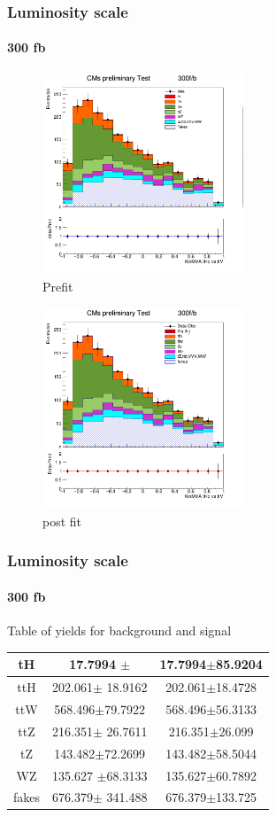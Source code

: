 \documentclass[11pt]{beamer}
\begin{document}
\begin{frame}
\frametitle{Luminosity scale}
\framesubtitle{300 fb}
\begin{multicols}{2}
	\begin{center}
		\begin{figure}
			\includegraphics[width=6cm,height=6cm]{figures/300fb/kin-300.png}
				\caption*{Prefit }
		\end{figure}
	\end{center}
	\columnbreak
	\begin{center}
		\begin{figure}
			\includegraphics[width=6cm,height=6cm]{figures/300fb/simple.png}
				\caption*{post fit }
		\end{figure}
	\end{center}
\end{multicols}
\end{frame}

\begin{frame}
\frametitle{Luminosity scale}
\framesubtitle{300 fb}
Table of yields for background and signal
\begin{table}
	\begin{tabular}{|c|c|c|}
			\hline
tH & 17.7994 $\pm$ & 17.7994$\pm$85.9204\\
\hline
ttH  & 202.061$\pm$ 18.9162 & 202.061$\pm$18.4728\\
\hline
ttW  & 568.496$\pm$79.7922 & 568.496$\pm$56.3133\\
\hline
ttZ  & 216.351$\pm$ 26.7611 & 216.351$\pm$26.099\\
\hline
tZ & 143.482$\pm$72.2699 & 143.482$\pm$58.5044\\
\hline
WZ & 135.627 $\pm$68.3133& 135.627$\pm$60.7892\\
\hline
fakes  & 676.379$\pm$ 341.488 & 676.379$\pm$133.725\\
	\hline
	\end{tabular}
\end{table}
\end{frame}
\end{document}
